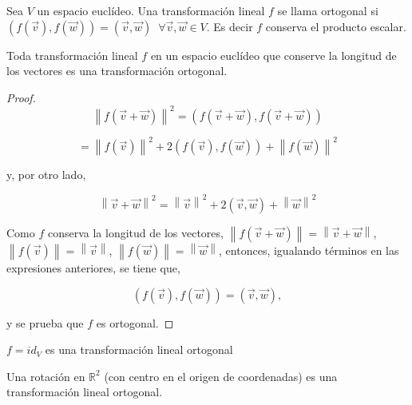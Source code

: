 {\bigskip

\begin{theorem}

Sea $V$ un espacio euclídeo. Una transformación lineal $f$  se llama ortogonal si 
$(f(\vec{v}),f(\vec{w}))=(\vec{v},\vec{w})$ $~\forall \vec{v},\vec{w} \in V$. Es decir $f$ conserva el producto escalar.
\end{theorem}


\bigskip

\begin{theorem}
Toda transformación lineal $f$ en un espacio euclídeo  que conserve la longitud de los vectores  es una transformación ortogonal.

\begin{proof} 

$$\left\|f(\vec{v}+\vec{w})\right\|^{2}=   (f(\vec{v}+\vec{w}),f(\vec{v}+\vec{w})) $$

$$=\left\|f(\vec{v})\right\|^{2}  +2   (f(\vec{v}),f(\vec{w})) +  \left\|f(\vec{w})\right\|^{2} $$

\bigskip

\noindent
y, por otro lado, 

$$\left\|\vec{v}+\vec{w}   \right\|^{2} =   \left\|\vec{v}\right\|^{2} +2   (\vec{v},\vec{w}) +  \left\|\vec{w}\right\|^{2} $$

\bigskip

Como $f$ conserva la longitud de los vectores, $\left\|f(\vec{v}+\vec{w})\right\|=\left\|\vec{v}+\vec{w}\right\|$, $\left\|f(\vec{v})\right\|=\left\|\vec{v}\right\|$, $\left\|f(\vec{w})\right\|=\left\|\vec{w}\right\|$, entonces, igualando términos en las expresiones anteriores, se tiene que, 

\bigskip
$$(f(\vec{v}),f(\vec{w}))=(\vec{v},\vec{w}),$$

\noindent
y se  prueba que $f$ es ortogonal.

\end{proof} 
\end{theorem}

\bigskip

   \begin{example}
  
  $f=id_V$  es una transformación lineal ortogonal
\end{example} 

\bigskip


\begin{example} 
  
  
  Una rotación en $\mathbb{R}^{2}$ (con centro en el origen de coordenadas) es una transformación lineal ortogonal.
  

\end{example}}
